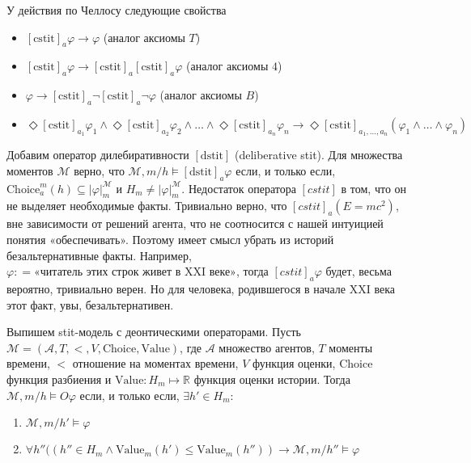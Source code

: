\documentclass[openany]{book}
\theoremstyle{plain}
\theoremstyle{definition}
\begin{document}
У действия по Челлосу следующие свойства
\begin{itemize}
    \item \([\mathrm{cstit}]_a \varphi \to \varphi\) (аналог аксиомы \(T\))
    \item \([\mathrm{cstit}]_a \varphi \to [\mathrm{cstit}]_a [\mathrm{cstit}]_a \varphi\) (аналог аксиомы \(4\))
    \item \(\varphi \to  [\mathrm{cstit}]_a \neg [\mathrm{cstit}]_a \neg \varphi\) (аналог аксиомы \(B\))
    \item \(\Diamond [\mathrm{cstit}]_{a_1} \varphi_1 \land \Diamond[\mathrm{cstit}]_{a_2} \varphi_2 \land \dots \land \Diamond[\mathrm{cstit}]_{a_n} \varphi_n \to \Diamond [\mathrm{cstit}]_{a_1, \ldots, a_n} (\varphi_1 \land \dots \land \varphi_n) \)
\end{itemize}

Добавим оператор дилебиративности \([\mathrm{dstit}]\) (deliberative stit). Для множества моментов \(\mathcal{M}\) верно, что \(\mathcal{M}, m/h \models [\mathrm{dstit}]_a \varphi\) если, и только если,  \(\mathrm{Choice}_a^m (h) \subseteq |\varphi|_m^{\mathcal{M}}\) и \(H_m \not=|\varphi|_m^{\mathcal{M}} \). Недостаток оператора \([cstit]\) в том, что он не выделяет необходимые факты. Тривиально верно, что \([cstit]_a (E = m c^2)\), вне зависимости от решений агента, что не соотносится с нашей интуицией понятия «обеспечивать». Поэтому имеет смысл убрать из историй безальтернативные факты. Например, \(\varphi : = \text{«читатель этих строк живет в XXI веке»}\), тогда \([cstit]_a \varphi\) будет, весьма вероятно, тривиально верен. Но для человека, родившегося в начале XXI века этот факт, увы, безальтернативен. 

Выпишем stit-модель с деонтическими операторами. Пусть \(\mathcal{M} = (\mathcal{A}, T, <, V, \mathrm{Choice}, \mathrm{Value})\), где \(\mathcal{A}\) множество агентов, \(T\) моменты времени, \(<\) отношение на моментах времени, \(V\) функция оценки, \(\mathrm{Choice}\) функция разбиения и \(\mathrm{Value} : H_m \mapsto \mathbb{R} \) функция оценки истории. Тогда \(\mathcal{M}, m/h \models O \varphi\) если, и только если, \(\exists h' \in H_m\):
\begin{enumerate}
    \item\(\mathcal{M}, m/h' \models \varphi\)
    \item\(\forall h''((h'' \in H_m \land \mathrm{Value}_m (h') \leq \mathrm{Value}_m (h'')) \to \mathcal{M}, m/h'' \models \varphi\)
\end{enumerate}
\end{document}
